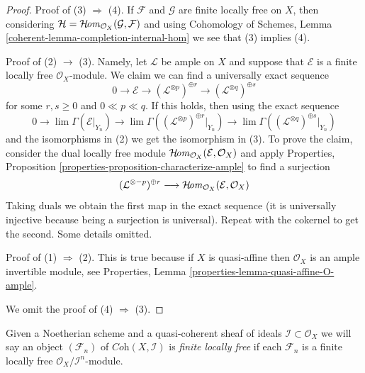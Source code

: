 \begin{proof}
Proof of (3) $\Rightarrow$ (4). If $\mathcal{F}$ and $\mathcal{G}$
are finite locally free on $X$, then considering
$\mathcal{H} = \mathop{\mathcal{H}\!\mathit{om}}\nolimits_{\mathcal{O}_X}(\mathcal{G}, \mathcal{F})$
and using Cohomology of Schemes, Lemma
\ref{coherent-lemma-completion-internal-hom}
we see that (3) implies (4).

\medskip\noindent
Proof of (2) $\rightarrow$ (3). Namely, let $\mathcal{L}$ be ample
on $X$ and suppose that $\mathcal{E}$ is a
finite locally free $\mathcal{O}_X$-module.
We claim we can find a universally exact sequence
$$
0 \to \mathcal{E} \to
(\mathcal{L}^{\otimes p})^{\oplus r} \to
(\mathcal{L}^{\otimes q})^{\oplus s}
$$
for some $r, s \geq 0$ and $0 \ll p \ll q$. If this holds, then
using the exact sequence
$$
0 \to \lim \Gamma(\mathcal{E}|_{Y_n}) \to
\lim \Gamma((\mathcal{L}^{\otimes p})^{\oplus r}|_{Y_n}) \to
\lim \Gamma((\mathcal{L}^{\otimes q})^{\oplus s}|_{Y_n})
$$
and the isomorphisms in (2) we get the isomorphism in (3).
To prove the claim, consider the dual locally free module
$\mathop{\mathcal{H}\!\mathit{om}}\nolimits_{\mathcal{O}_X}(\mathcal{E}, \mathcal{O}_X)$
and apply
Properties, Proposition \ref{properties-proposition-characterize-ample}
to find a surjection
$$
(\mathcal{L}^{\otimes -p})^{\oplus r}
\longrightarrow
\mathop{\mathcal{H}\!\mathit{om}}\nolimits_{\mathcal{O}_X}(\mathcal{E}, \mathcal{O}_X)
$$
Taking duals we obtain the first map in the exact sequence
(it is universally injective because being a surjection is universal).
Repeat with the cokernel to get the second. Some details omitted.

\medskip\noindent
Proof of (1) $\Rightarrow$ (2). This is true because if $X$ is quasi-affine
then $\mathcal{O}_X$ is an ample invertible module, see
Properties, Lemma \ref{properties-lemma-quasi-affine-O-ample}.

\medskip\noindent
We omit the proof of (4) $\Rightarrow$ (3).
\end{proof}

\noindent
Given a Noetherian scheme and a quasi-coherent sheaf of ideals
$\mathcal{I} \subset \mathcal{O}_X$ we will say
an object $(\mathcal{F}_n)$ of $\textit{Coh}(X, \mathcal{I})$
is {\it finite locally free} if each $\mathcal{F}_n$ is a finite
locally free $\mathcal{O}_X/\mathcal{I}^n$-module.

